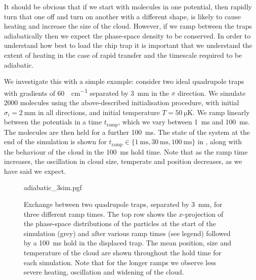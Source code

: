 It should be obvious that if we start with molecules in one potential, then
rapidly turn that one off and turn on another with a different shape, is likely
to cause heating and increase the size of the cloud.  However, if we ramp
between the traps adiabatically then we expect the phase-space density to be
conserved. In order to understand how best to load the chip trap it is
important that we understand the extent of heating in the case of rapid
transfer and the timescale required to be adiabatic.

We investigate this with a simple example: consider two ideal quadrupole traps
with gradients of \SI{60}{\gauss\per\centi\meter} separated by
\SI{3}{\milli\meter} in the $x$ direction. We simulate 2000 \CaF{} molecules
using the above-described initialisation procedure, with initial $\sigma_i =
\SI{2}{\milli\meter}$ in all directions, and initial temperature
$T=\SI{50}{\micro\kelvin}$. We ramp linearly between the potentials in a time
$t_\text{ramp}$, which we vary between \SI{1}{\milli\second} and
\SI{100}{\milli\second}. The molecules are then held for a further
\SI{100}{\milli\second}. The state of the system at the end of the simulation
is shown for $t_\text{ramp}\in \{\SI{1}{\milli\second}, \SI{30}{\milli\second},
\SI{100}{\milli\second}\}$ in , along with the
behaviour of the cloud in the \SI{100}{\milli\second} hold time. Note that as
the ramp time increases, the oscillation in cloud size, temperate and position
decreases, as we have said we expect.

\begin{figure}[p]
\centering
  {adiabatic_3sim.pgf}
  \caption{
    Exchange between two quadrupole traps, separated by \SI{3}{\milli\meter},
    for three different ramp times. The top row shows the $x$-projection of the
    phase-space distributions of the particles at the start of the simulation
    (grey) and after various ramp times (see legend) followed by a
    \SI{100}{\milli\second} hold in the displaced trap. The mean position, size
    and temperature of the cloud are shown throughout the hold time for each
    simulation. Note that for the longer ramps we observe less severe heating,
    oscillation and widening of the cloud.
  }
  \label{design:fig:adia3sim}
\end{figure}


